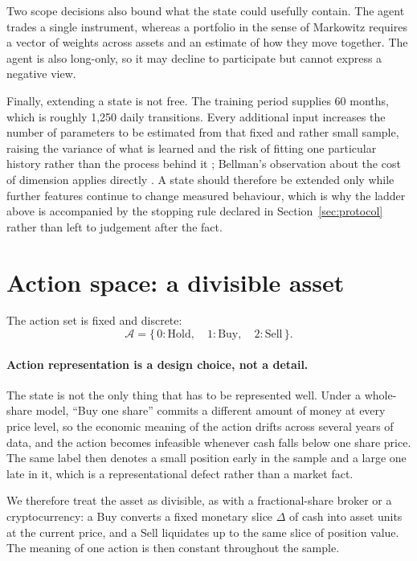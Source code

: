 Two scope decisions also bound what the state could usefully contain. The
agent trades a single instrument, whereas a portfolio in the sense of
Markowitz \cite{markowitz1952} requires a vector of weights across assets
and an estimate of how they move together. The agent is also long-only,
so it may decline to participate but cannot express a negative view.

Finally, extending a state is not free. The training period supplies 60
months, which is roughly 1{,}250 daily transitions. Every additional
input increases the number of parameters to be estimated from that fixed
and rather small sample, raising the variance of what is learned and the
risk of fitting one particular history rather than the process behind it
\cite{lopezdeprado2018}; Bellman's observation about the cost of dimension
applies directly \cite{bellman1957}. A state should therefore be extended
only while further features continue to change measured behaviour, which
is why the ladder above is accompanied by the stopping rule declared in
Section~\ref{sec:protocol} rather than left to judgement after the fact.

\section{Action space: a divisible asset}
\label{sec:actions}

The action set is fixed and discrete:
\[
\mathcal{A} = \{\,0:\text{Hold},\quad 1:\text{Buy},\quad 2:\text{Sell}\,\}.
\]

\paragraph{Action representation is a design choice, not a detail.} The
state is not the only thing that has to be represented well. Under a
whole-share model, ``Buy one share'' commits a different amount of money
at every price level, so the economic meaning of the action drifts across
several years of data, and the action becomes infeasible whenever cash
falls below one share price. The same label then denotes a small position
early in the sample and a large one late in it, which is a
representational defect rather than a market fact.

We therefore treat the asset as divisible, as with a fractional-share
broker or a cryptocurrency: a Buy converts a fixed monetary slice $\Delta$
of cash into asset units at the current price, and a Sell liquidates up to
the same slice of position value. The meaning of one action is then
constant throughout the sample.

